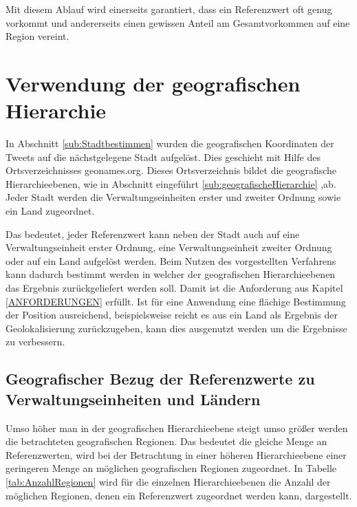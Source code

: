 				Mit diesem Ablauf wird einerseits garantiert, dass ein Referenzwert oft genug vorkommt und andererseits einen gewissen Anteil am Gesamtvorkommen auf eine Region vereint.

	\section{Verwendung der geografischen Hierarchie} \label{sec:ausnutzenDerGeografischenHierarchie}

		In Abschnitt \ref{sub:Stadtbestimmen} wurden die geografischen Koordinaten der Tweets auf die nächstgelegene Stadt aufgelöst. 
		Dies geschieht mit Hilfe des Ortsverzeichnisses geonames.org. 	
		Dieses Ortsverzeichnis bildet die geografische Hierarchieebenen, wie in Abschnitt eingeführt \ref{sub:geografischeHierarchie} ,ab. 
		Jeder Stadt werden die Verwaltungseinheiten erster und zweiter Ordnung sowie ein Land zugeordnet.

		Das bedeutet, jeder Referenzwert kann neben der Stadt auch auf eine Verwaltungseinheit erster Ordnung, eine Verwaltungseinheit zweiter Ordnung oder auf ein Land aufgelöst werden.
		Beim Nutzen des vorgestellten Verfahrens kann dadurch bestimmt werden in welcher der geografischen Hierarchieebenen das Ergebnis zurückgeliefert werden soll. 
		Damit ist die Anforderung aus Kapitel \ref{ANFORDERUNGEN} erfüllt.
		Ist für eine Anwendung eine flächige Bestimmung der Position ausreichend, beispielsweise reicht es aus ein Land als Ergebnis der Geolokalisierung zurückzugeben, kann dies ausgenutzt werden um die Ergebnisse zu verbessern.

		\subsection{Geografischer Bezug der Referenzwerte zu Verwaltungseinheiten und Ländern} 

			Umso höher man in der geografischen Hierarchieebene steigt umso größer werden die betrachteten geografischen Regionen.
			Das bedeutet die gleiche Menge an Referenzwerten, wird bei der Betrachtung in einer höheren Hierarchieebene einer geringeren Menge an möglichen geografischen Regionen zugeordnet.
			In Tabelle \ref{tab:AnzahlRegionen} wird für die einzelnen Hierarchieebenen die Anzahl der möglichen Regionen, denen ein Referenzwert zugeordnet werden kann, dargestellt.
			
